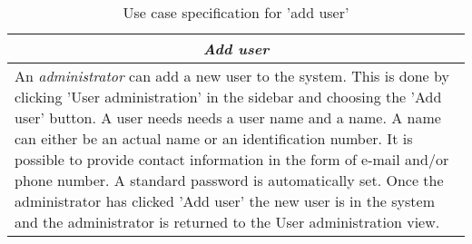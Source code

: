 \begin{table}
\centering
\begin{tabular}{p{12cm}}
\hline
\multicolumn{1}{c}{\textit{\textbf{Add user}}} \\
\hline
An \textit{administrator} can add a new user to the system.
This is done by clicking 'User administration' in the sidebar and choosing the 'Add user' button.
A user needs needs a user name and a name.
A name can either be an actual name or an identification number.
It is possible to provide contact information in the form of e-mail and/or phone number.
A standard password is automatically set.
Once the administrator has clicked 'Add user' the new user is in the system and the administrator is returned to the User administration view.
\\\hline
\end{tabular}
\caption{Use case specification for 'add user'}\label{tab:add-user}
\end{table}